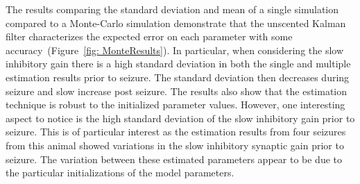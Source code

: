 The results comparing the standard deviation and mean of a single simulation compared to a Monte-Carlo simulation demonstrate that the unscented Kalman filter characterizes the expected error on each parameter with some accuracy~(Figure~\ref{fig: MonteResults}). In particular, when considering the slow inhibitory gain there is a high standard deviation in both the single and multiple estimation results prior to seizure. The standard deviation then decreases during seizure and slow increase post seizure. The results also show that the estimation technique is robust to the initialized parameter values. However, one interesting aspect to notice is the high standard deviation of the slow inhibitory gain prior to seizure. This is of particular interest as the estimation results from four seizures from this animal showed variations in the slow inhibitory synaptic gain prior to seizure. The variation between these estimated parameters appear to be due to the particular initializations of the model parameters.

















